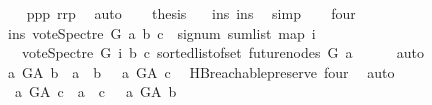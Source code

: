 \begin{isabellebody}
\ \ \isamarkupfalse%
\ ppp\ rrp\ \isamarkupfalse%
\ auto\isanewline
\ \ \isamarkupfalse%
\ {\isacharquery}{\kern0pt}thesis\ \ \isamarkupfalse%
\ ins\ ins{\isacharunderscore}{\kern0pt}{}\ \isamarkupfalse%
\ simp\isanewline
{}\isamarkupfalse%
\isanewline
\ \ \isamarkupfalse%
\ four\isanewline
\ \ \isamarkupfalse%
\ \isamarkupfalse%
\ ins{\isacharcolon}{\kern0pt}\ {\isachardoublequoteopen}vote{\isacharunderscore}{\kern0pt}Spectre\ G\ a\ b\ c\ {\isacharequal}{\kern0pt}\ signum\ {\isacharparenleft}{\kern0pt}sum{\isacharunderscore}{\kern0pt}list\ {\isacharparenleft}{\kern0pt}map\ {\isacharparenleft}{\kern0pt}{\isasymlambda}i{\isachardot}{\kern0pt}\isanewline
\ \ \ {\isacharparenleft}{\kern0pt}vote{\isacharunderscore}{\kern0pt}Spectre\ G\ i\ b\ c{\isacharparenright}{\kern0pt}{\isacharparenright}{\kern0pt}\ {\isacharparenleft}{\kern0pt}sorted{\isacharunderscore}{\kern0pt}list{\isacharunderscore}{\kern0pt}of{\isacharunderscore}{\kern0pt}set\ {\isacharparenleft}{\kern0pt}future{\isacharunderscore}{\kern0pt}nodes\ G\ a{\isacharparenright}{\kern0pt}{\isacharparenright}{\kern0pt}{\isacharparenright}{\kern0pt}{\isacharparenright}{\kern0pt}{\isachardoublequoteclose}\isanewline
\ \ \ \ \isamarkupfalse%
\ auto\isanewline
\ \ \ \isamarkupfalse%
\ {\isachardoublequoteopen}{\isasymnot}{\isacharparenleft}{\kern0pt}{\isacharparenleft}{\kern0pt}a\ {\isasymrightarrow}\isactrlsup {\isacharplus}{\kern0pt}\isactrlbsub G{\isacharunderscore}{\kern0pt}A\isactrlesub \ b\ {\isasymor}\ a\ {\isacharequal}{\kern0pt}\ b{\isacharparenright}{\kern0pt}\ {\isasymand}\ {\isacharparenleft}{\kern0pt}{\isasymnot}\ a\ {\isasymrightarrow}\isactrlsup {\isacharplus}{\kern0pt}\isactrlbsub G{\isacharunderscore}{\kern0pt}A\isactrlesub \ c{\isacharparenright}{\kern0pt}{\isacharparenright}{\kern0pt}{\isachardoublequoteclose}\ \isamarkupfalse%
\ HB{}{\isachardot}{\kern0pt}reachable{}{\isacharunderscore}{\kern0pt}preserve\ four\ \isamarkupfalse%
\ auto\isanewline
\ \ \isamarkupfalse%
\ \isamarkupfalse%
\ {\isachardoublequoteopen}{\isasymnot}\ {\isacharparenleft}{\kern0pt}{\isacharparenleft}{\kern0pt}a\ {\isasymrightarrow}\isactrlsup {\isacharplus}{\kern0pt}\isactrlbsub G{\isacharunderscore}{\kern0pt}A\isactrlesub \ c\ {\isasymor}\ a\ {\isacharequal}{\kern0pt}\ c{\isacharparenright}{\kern0pt}\ {\isasymand}\ {\isacharparenleft}{\kern0pt}{\isasymnot}\ a\ {\isasymrightarrow}\isactrlsup {\isacharplus}{\kern0pt}\isactrlbsub G{\isacharunderscore}{\kern0pt}A\isactrlesub \ b{\isacharparenright}{\kern0pt}{\isacharparenright}{\kern0pt}{\isachardoublequoteclose}\ \isanewline

\end{isabellebody}
